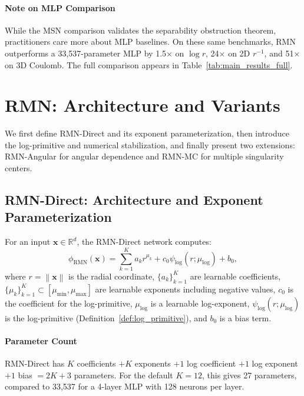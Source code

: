 \documentclass[twoside,11pt]{article}
\newcommand{\R}{\mathbb{R}}
\newcommand{\bx}{\bm{x}}
\newcommand{\norm}[1]{\left\|#1\right\|}
\begin{document}
\paragraph{Note on MLP Comparison} While the MSN comparison validates the separability obstruction theorem, practitioners care more about MLP baselines. On these same benchmarks, RMN outperforms a 33,537-parameter MLP by 1.5$\times$ on $\log r$, 24$\times$ on 2D $r^{-1}$, and 51$\times$ on 3D Coulomb. The full comparison appears in Table~\ref{tab:main_results_full}.

\section{RMN: Architecture and Variants}
\label{sec:architecture}

We first define RMN-Direct and its exponent parameterization, then introduce the log-primitive and numerical stabilization, and finally present two extensions: RMN-Angular for angular dependence and RMN-MC for multiple singularity centers.

\subsection{RMN-Direct: Architecture and Exponent Parameterization}
\label{subsec:rmn_definition}

\begin{definition}
	For an input $\bx \in \R^d$, the RMN-Direct network computes:
	\begin{equation}
		\boxed{\phi_{\text{RMN}}(\bx) = \sum_{k=1}^{K} a_k r^{\mu_k} + c_0 \psi_{\log}(r;\mu_{\log}) + b_0},
		\label{eq:rmn_direct}
	\end{equation}
	where $r = \norm{\bx}$ is the radial coordinate, $\{a_k\}_{k=1}^K$ are learnable coefficients, $\{\mu_k\}_{k=1}^K \subset [\mu_{\min}, \mu_{\max}]$ are learnable exponents including negative values, $c_0$ is the coefficient for the log-primitive, $\mu_{\log}$ is a learnable log-exponent, $\psi_{\log}(r;\mu_{\log})$ is the log-primitive (Definition~\ref{def:log_primitive}), and $b_0$ is a bias term.
\end{definition}

\paragraph{Parameter Count} RMN-Direct has $K$ coefficients $+ K$ exponents $+ 1$ log coefficient $+ 1$ log exponent $+ 1$ bias $= 2K + 3$ parameters. For the default $K = 12$, this gives 27 parameters, compared to 33,537 for a 4-layer MLP with 128 neurons per layer.
\end{document}

